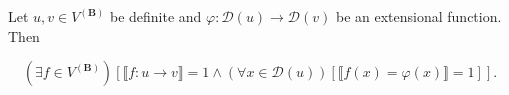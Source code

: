 Let $u, v \in V^{(\mathbf{B})}$ be definite and $\varphi: \mathcal{D}(u) \rightarrow \mathcal{D}(v)$ be an extensional function. Then

$$(\exists f \in V^{(\mathbf{B})})[\llbracket f: u \rightarrow v \rrbracket = 1 \wedge (\forall x \in \mathcal{D}(u))[\llbracket f(x) = \varphi(x) \rrbracket = 1]].$$
